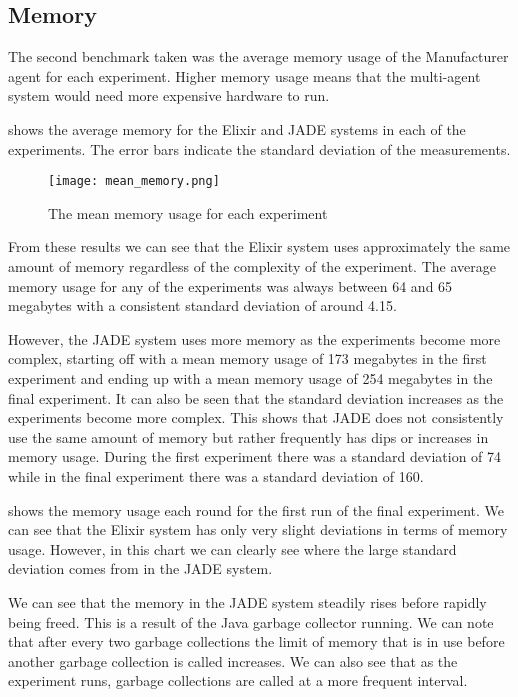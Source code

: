 \subsection{Memory}

The second benchmark taken was the average memory usage of the Manufacturer agent for each experiment.
Higher memory usage means that the multi-agent system would need more expensive hardware to run.

 shows the average memory for the Elixir and JADE systems in each of the experiments.
The error bars indicate the standard deviation of the measurements.

\begin{figure}[ht]
    \centering
    \texttt{[image: mean\_memory.png]}
    \caption{The mean memory usage for each experiment}\label{fig:mean_memory}
\end{figure}

From these results we can see that the Elixir system uses approximately the same amount of memory regardless of the complexity of the experiment.
The average memory usage for any of the experiments was always between 64 and 65 megabytes with a consistent standard deviation of around 4.15.

However, the JADE system uses more memory as the experiments become more complex, starting off with a mean memory usage of 173 megabytes in the first experiment and ending up with a mean memory usage of 254 megabytes in the final experiment.
It can also be seen that the standard deviation increases as the experiments become more complex.
This shows that JADE does not consistently use the same amount of memory but rather frequently has dips or increases in memory usage.
During the first experiment there was a standard deviation of 74 while in the final experiment there was a standard deviation of 160.

 shows the memory usage each round for the first run of the final experiment.
We can see that the Elixir system has only very slight deviations in terms of memory usage.
However, in this chart we can clearly see where the large standard deviation comes from in the JADE system.

We can see that the memory in the JADE system steadily rises before rapidly being freed.
This is a result of the Java garbage collector running.
We can note that after every two garbage collections the limit of memory that is in use before another garbage collection is called increases.
We can also see that as the experiment runs, garbage collections are called at a more frequent interval.

